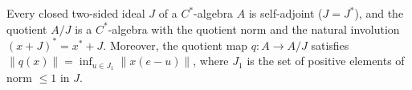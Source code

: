 Every closed two-sided ideal $J$ of a $C^*$-algebra $A$ is self-adjoint ($J = J^*$), and the quotient $A/J$ is a $C^*$-algebra with the quotient norm and the natural involution $(x + J)^* = x^* + J$. Moreover, the quotient map $q: A \to A/J$ satisfies $\|q(x)\| = \inf_{u \in J_1} \|x(e - u)\|$, where $J_1$ is the set of positive elements of norm $\leq 1$ in $J$.

